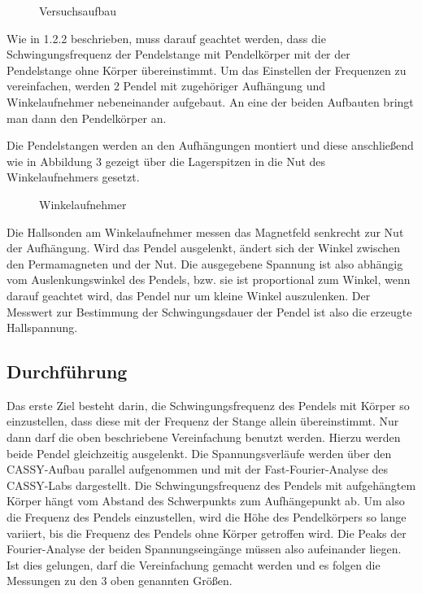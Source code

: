 \documentclass[a4paper, 11pt]{article}
\begin{document}
\begin{figure} [H]
\centering
	\caption[Versuchsaufbau]{Versuchsaufbau}
\end{figure}

Wie in 1.2.2 beschrieben, muss darauf geachtet werden, dass die Schwingungsfrequenz der Pendelstange mit Pendelkörper mit der der Pendelstange ohne Körper übereinstimmt. Um das Einstellen der Frequenzen zu vereinfachen, werden 2 Pendel mit zugehöriger Aufhängung und Winkelaufnehmer nebeneinander aufgebaut. An eine der beiden Aufbauten bringt man dann den Pendelkörper an.
\newpage

Die Pendelstangen werden an den Aufhängungen montiert und diese anschließend wie in Abbildung 3 gezeigt über die Lagerspitzen in die Nut des Winkelaufnehmers gesetzt.\\

\begin{figure} [H]
\centering
	\caption{Winkelaufnehmer}
\end{figure}

Die Hallsonden am Winkelaufnehmer messen das Magnetfeld senkrecht zur Nut der Aufhängung. Wird das Pendel ausgelenkt, ändert sich der Winkel zwischen den Permamagneten und der Nut. Die ausgegebene Spannung ist also abhängig vom Auslenkungswinkel des Pendels, bzw. sie ist proportional zum Winkel, wenn darauf geachtet wird, das Pendel nur um kleine Winkel auszulenken. Der Messwert zur Bestimmung der Schwingungsdauer der Pendel ist also die erzeugte Hallspannung.\\


\subsection{Durchführung}
Das erste Ziel besteht darin, die Schwingungsfrequenz des Pendels mit Körper so einzustellen, dass diese mit der Frequenz der Stange allein übereinstimmt. Nur dann darf die oben beschriebene Vereinfachung benutzt werden.
Hierzu werden beide Pendel gleichzeitig ausgelenkt. Die Spannungsverläufe werden über den CASSY-Aufbau parallel aufgenommen und mit der Fast-Fourier-Analyse des CASSY-Labs dargestellt. Die Schwingungsfrequenz des Pendels mit aufgehängtem Körper hängt vom Abstand des Schwerpunkts zum Aufhängepunkt ab. Um also die Frequenz des Pendels einzustellen, wird die Höhe des Pendelkörpers so lange variiert, bis die Frequenz des Pendels ohne Körper getroffen wird. Die Peaks der Fourier-Analyse der beiden Spannungseingänge müssen also aufeinander liegen. 
Ist dies gelungen, darf die Vereinfachung gemacht werden und es folgen die Messungen zu den 3 oben genannten Größen.
\newpage
\end{document}
